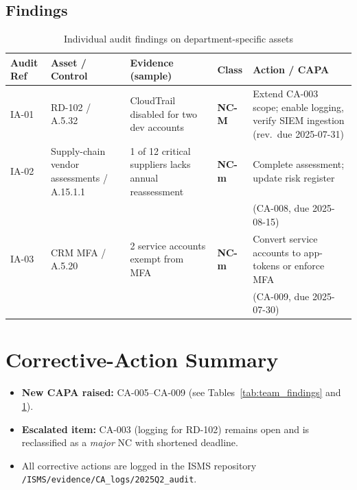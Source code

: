 \subsection{Findings}
\begin{table}[htbp]
  \centering
  \caption{Individual audit findings on department-specific assets}
  \label{tab:indiv_findings}
  \begin{tabular}{|p{1.3cm}|p{2.6cm}|p{3.2cm}|p{1.3cm}|p{3.3cm}|}
    \hline
    \textbf{Audit Ref} & \textbf{Asset / Control} & \textbf{Evidence (sample)} & \textbf{Class} & \textbf{Action / CAPA} \\
    \hline
    IA-01 & RD-102 / A.5.32 & CloudTrail disabled for two dev accounts & \textbf{NC-M} & Extend CA-003 scope; enable logging, verify SIEM ingestion (rev.\ due 2025-07-31) \\
    \hline
    IA-02 & Supply-chain vendor assessments / A.15.1.1 & 1 of 12 critical suppliers lacks annual reassessment & \textbf{NC-m} & Complete assessment; update risk register\\
          &                                               &                                               &            & (CA-008, due 2025-08-15) \\
    \hline
    IA-03 & CRM MFA / A.5.20 & 2 service accounts exempt from MFA & \textbf{NC-m} & Convert service accounts to app-tokens or enforce MFA\\
          &                   &                                  &            & (CA-009, due 2025-07-30) \\
    \hline
  \end{tabular}
\end{table}

\section{Corrective-Action Summary}
\begin{itemize}
  \item \textbf{New CAPA raised:} CA-005–CA-009 (see Tables~\ref{tab:team_findings} and \ref{tab:indiv_findings}).
  \item \textbf{Escalated item:} CA-003 (logging for RD-102) remains open and
        is reclassified as a \emph{major} NC with shortened deadline.
  \item All corrective actions are logged in the \ac{ISMS} repository
        \texttt{/ISMS/evidence/CA\_logs/2025Q2\_audit}.
\end{itemize}

